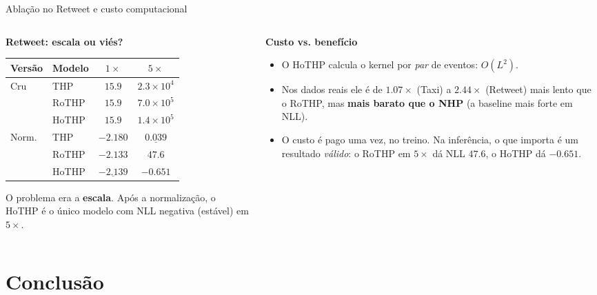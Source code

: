 \documentclass[aspectratio=169,9pt]{beamer}
\begin{document}
\begin{frame}{Ablação no Retweet e custo computacional}
  \begin{columns}[T]
    \begin{column}{0.5\textwidth}
      \textbf{Retweet: escala ou viés?}
      {\scriptsize
      \begin{tabular}{llcc}
        \toprule
        Versão & Modelo & $1\times$ & $5\times$ \\
        \midrule
        \multirow{3}{*}{Cru}
          & THP   & $15.9$ & $2.3{\times}10^{4}$ \\
          & RoTHP & $15.9$ & $7.0{\times}10^{5}$ \\
          & HoTHP & $15.9$ & $1.4{\times}10^{5}$ \\
        \midrule
        \multirow{3}{*}{Norm.}
          & THP   & $\mathbf{-2.180}$ & $\underline{0.039}$ \\
          & RoTHP & $-2.133$ & $47.6$ \\
          & HoTHP & $\underline{-2.139}$ & $\mathbf{-0.651}$ \\
        \bottomrule
      \end{tabular}}
      \vspace{0.4em}

      {\small O problema era a \textbf{escala}. Após a normalização, o HoTHP é o
      único modelo com NLL negativa (estável) em $5\times$.}
    \end{column}
    \begin{column}{0.5\textwidth}
      \textbf{Custo vs. benefício}
      \begin{itemize}
        \small
        \item O HoTHP calcula o kernel por \emph{par} de eventos: $O(L^2)$.
        \item Nos dados reais ele é de $1.07\times$ (Taxi) a $2.44\times$ (Retweet)
              mais lento que o RoTHP, mas \textbf{mais barato que o NHP} (a
              baseline mais forte em NLL).
        \item O custo é pago uma vez, no treino. Na inferência, o que importa é um
              resultado \emph{válido}: o RoTHP em $5\times$ dá NLL $47.6$, o HoTHP
              dá $-0.651$.
      \end{itemize}
    \end{column}
  \end{columns}
\end{frame}

\section{Conclusão}
\end{document}
